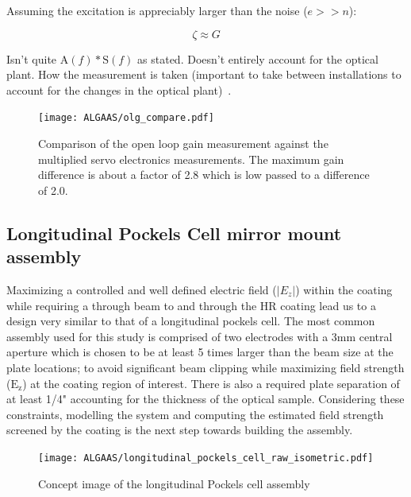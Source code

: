Assuming the excitation is appreciably larger than the noise ($e>>n$):

\begin{equation}
\zeta \approx G
\end{equation}

Isn't quite $\mathrm{A}(f)*\mathrm{S}(f)$ as stated. Doesn't entirely account for the optical plant.
How the measurement is taken (important to take between installations to account for the changes in the optical plant)~\cite{sugwglog:831}.

\begin{figure}[H]
\begin{center}
\texttt{[image: ALGAAS/olg\_compare.pdf]}
\end{center}
\caption{Comparison of the open loop gain measurement against the multiplied servo electronics measurements. The maximum gain difference is about a factor of 2.8 which is low passed to a difference of 2.0.}
\label{fig:OLGcompare}
\end{figure}

\subsection{Longitudinal Pockels Cell mirror mount assembly}
Maximizing a controlled and well defined electric field ($|E_z|$) within the coating while requiring a through beam to and through the HR coating lead us to a design very similar to that of a longitudinal pockels cell. The most common assembly used for this study is comprised of two electrodes with a 3mm central aperture which is chosen to be at least 5 times larger than the beam size at the plate locations; to avoid significant beam clipping while maximizing field strength ($\mathrm{E}_\mathrm{z}$) at the coating region of interest. There is also a required plate separation of at least 1/4" accounting for the thickness of the optical sample. Considering these constraints, modelling the system and computing the estimated field strength screened by the coating is the next step towards building the assembly.

\begin{figure}[H]
\begin{center}
\texttt{[image: ALGAAS/longitudinal\_pockels\_cell\_raw\_isometric.pdf]}
\end{center}
\caption{Concept image of the longitudinal Pockels cell assembly}
\label{fig:pckcellconcept}
\end{figure}

